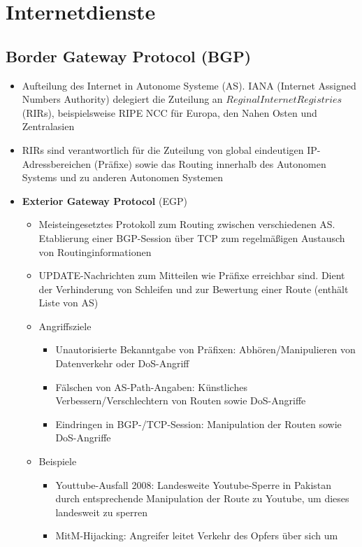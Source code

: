 \section{Internetdienste}

\subsection{Border Gateway Protocol (BGP)}
\begin{itemize}
	\item Aufteilung des Internet in Autonome Systeme (AS). IANA (Internet Assigned Numbers Authority) delegiert die Zuteilung an \(Reginal Internet Registries\) (RIRs), beispielsweise RIPE NCC für Europa, den Nahen Osten und Zentralasien
	\item RIRs sind verantwortlich für die Zuteilung von global eindeutigen IP-Adressbereichen (Präfixe) sowie das Routing innerhalb des Autonomen Systems und zu anderen Autonomen Systemen
	\item \textbf{Exterior Gateway Protocol} (EGP)
	\begin{itemize}
		\item Meisteingesetztes Protokoll zum Routing zwischen verschiedenen AS. Etablierung einer BGP-Session über TCP zum regelmäßigen Austausch von Routinginformationen
		\item UPDATE-Nachrichten zum Mitteilen wie Präfixe erreichbar sind. Dient der Verhinderung von Schleifen und zur Bewertung einer Route (enthält Liste von AS)
		\item Angriffsziele
		\begin{itemize}
			\item Unautorisierte Bekanntgabe von Präfixen: Abhören/Manipulieren von Datenverkehr oder DoS-Angriff
			\item Fälschen von AS-Path-Angaben: Künstliches Verbessern/Verschlechtern von Routen sowie DoS-Angriffe
			\item Eindringen in BGP-/TCP-Session: Manipulation der Routen sowie DoS-Angriffe
		\end{itemize}
		\item Beispiele
		\begin{itemize}
			\item Youttube-Ausfall 2008: Landesweite Youtube-Sperre in Pakistan durch entsprechende Manipulation der Route zu Youtube, um dieses landesweit zu sperren
			\item MitM-Hijacking: Angreifer leitet Verkehr des Opfers über sich um
		\end{itemize}

\end{itemize}
\end{itemize}
